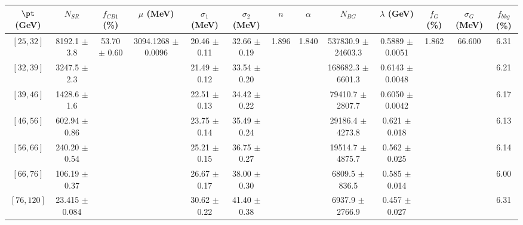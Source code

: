 \begin{tabular}{c||c|c|c|c|c|c|c|c|c|c|c||c}
$\pt$ (GeV) & $N_{SR}$ & $f_{CB1}$ (\%) & $\mu$ (MeV) & $\sigma_1$ (MeV) & $\sigma_2$ (MeV) & $n$ & $\alpha$ & $N_{BG}$ & $\lambda$ (GeV) & $f_G$ (\%) & $\sigma_G$ (MeV) & $f_{bkg}$ (\%) \\
\hline
$[25, 32]$ & 8192.1 $\pm$ 3.8 & \multirow{7}{*}{53.70 $\pm$ 0.60} & \multirow{7}{*}{3094.1268 $\pm$ 0.0096} & 20.46 $\pm$ 0.11 & 32.66 $\pm$ 0.19 & \multirow{7}{*}{1.896} & \multirow{7}{*}{1.840} & 537830.9 $\pm$ 24603.3 & 0.5889 $\pm$ 0.0051 & \multirow{7}{*}{1.862} & \multirow{7}{*}{66.600} & 6.31\\
$[32, 39]$ & 3247.5 $\pm$ 2.3 &  &  & 21.49 $\pm$ 0.12 & 33.54 $\pm$ 0.20 &  &  & 168682.3 $\pm$ 6601.3 & 0.6143 $\pm$ 0.0048 &  &  & 6.21\\
$[39, 46]$ & 1428.6 $\pm$ 1.6 &  &  & 22.51 $\pm$ 0.13 & 34.42 $\pm$ 0.22 &  &  & 79410.7 $\pm$ 2807.7 & 0.6050 $\pm$ 0.0042 &  &  & 6.17\\
$[46, 56]$ & 602.94 $\pm$ 0.86 &  &  & 23.75 $\pm$ 0.14 & 35.49 $\pm$ 0.24 &  &  & 29186.4 $\pm$ 4273.8 & 0.621 $\pm$ 0.018 &  &  & 6.13\\
$[56, 66]$ & 240.20 $\pm$ 0.54 &  &  & 25.21 $\pm$ 0.15 & 36.75 $\pm$ 0.27 &  &  & 19514.7 $\pm$ 4875.7 & 0.562 $\pm$ 0.025 &  &  & 6.14\\
$[66, 76]$ & 106.19 $\pm$ 0.37 &  &  & 26.67 $\pm$ 0.17 & 38.00 $\pm$ 0.30 &  &  & 6809.5 $\pm$ 836.5 & 0.585 $\pm$ 0.014 &  &  & 6.00\\
$[76, 120]$ & 23.415 $\pm$ 0.084 &  &  & 30.62 $\pm$ 0.22 & 41.40 $\pm$ 0.38 &  &  & 6937.9 $\pm$ 2766.9 & 0.457 $\pm$ 0.027 &  &  & 6.31\\
\end{tabular}
